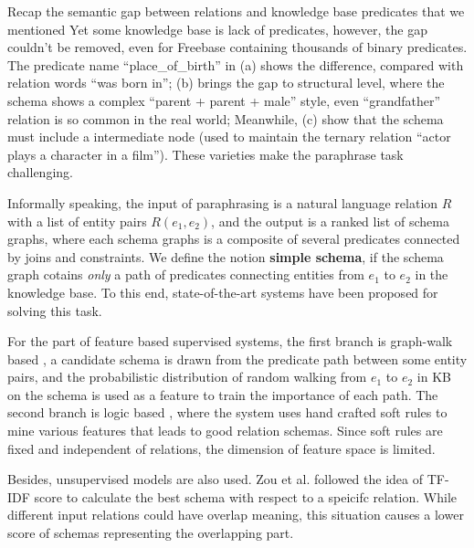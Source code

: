 Recap the semantic gap between relations and knowledge base predicates that we mentioned
Yet some knowledge base is lack of predicates, however, the gap couldn't be removed,
even for Freebase containing thousands of binary predicates.
The predicate name ``place\_of\_birth'' in  (a) shows the difference,
compared with relation words ``was born in''; 
 (b) brings the gap to structural level, where the schema shows a
complex ``parent + parent + male'' style, even ``grandfather'' relation is so common in
the real world; Meanwhile,  (c) show that the schema must include 
a intermediate node (used to maintain the ternary relation ``actor plays a character in a film'').
These varieties make the paraphrase task challenging.

Informally speaking, the input of paraphrasing is a natural language relation $R$ with a
list of entity pairs $R(e_1, e_2)$, and the output is a ranked list of schema graphs, where each
schema graphs is a composite of several predicates connected by joins and constraints.
We define the notion \textbf{simple schema}, if the schema graph cotains \textit{only}
a path of predicates connecting entities from $e_1$ to $e_2$ in the knowledge base. 
To this end, state-of-the-art systems have been proposed for solving this task.

For the part of feature based supervised systems, the first branch is graph-walk based 
\cite{lao2010relational,lao2011random}, a candidate schema is drawn from the predicate path 
between some entity pairs, and the probabilistic distribution of random walking from $e_1$ 
to $e_2$ in KB on the schema is used as a feature to train the importance of each path.
The second branch is logic based \cite{zhang2012ontological}, where the system uses hand 
crafted soft rules to mine various features that leads to good relation schemas. 
Since soft rules are fixed and independent of relations, the dimension of feature space
is limited.

Besides, unsupervised models are also used. Zou et al. \cite{zou2014natural}
followed the idea of TF-IDF score \cite{blabla} to calculate the best schema with respect to a
speicifc relation. While different input relations could have overlap meaning, this situation 
causes a lower score of schemas representing the overlapping part.

